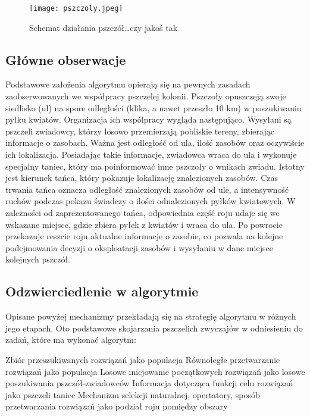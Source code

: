 \documentclass[a4paper,12pt,notitlepage]{mwrep}
\begin{document}
\begin{figure}[H] %
\centering
\texttt{[image: pszczoly.jpeg]}
\caption{Schemat działania pszczół\ldots czy jakoś tak}
\label{fig:Pszczoly}
\end{figure}

\subsection{Główne obserwacje}
Podstawowe założenia algorytmu opierają się na pewnych zasadach zaobserwowanych we współpracy pszczelej kolonii.
Pszczoły opuszczeją swoje siedlisko (ul) na spore odległości (klika, a nawet przeszło 10 km) w poszukiwaniu pyłku kwiatów.
Organizacja ich wspólpracy wygląda następująco. Wysyłani są pszczeli zwiadowcy, którzy losowo przemierzają pobliskie tereny,
zbierając informacje o zasobach. Ważna jest odległość od ula, ilość zasobów oraz oczywiście ich lokalizacja. Posiadając takie
informacje, zwiadowca wraca do ula i wykonuje specjalny taniec, który ma poinformować inne pszczoły o wnikach zwiadu. Istotny
jest kierunek tańca, który pokazuje lokalizację znalezionych zasobów. Czas trwania tańca oznacza odległość znalezionych zasobów
od ule, a intensywność ruchów podczas pokazu świadczy o ilości odnalezionych pyłków kwiatowych. W zależności od zaprezentowanego
tańca, odpowiednia część roju udaje się we wskazane miejsce, gdzie zbiera pyłek z kwiatów i wraca do ula. Po powrocie przekazuje
reszcie roju aktualne informacje o zasobie, co pozwala na kolejne podejmowania decyzji o oksploatacji zasobów i wysyłaniu w dane
miejsce kolejnych pszczół.

\subsection{Odzwierciedlenie w algorytmie}
Opisane powyżej mechanizmy przekładają się na strategię algorytmu w różnych jego etapach. Oto podstawowe skojarzania pszczelich zwyczajów w odniesieniu do zadań, które ma wykonać algorytm:
\begin{itemize}
	\fe	Zbiór przeszukiwanych rozwiązań jako populacja
	\fe	Równoległe przetwarzanie rozwiązań jako populacja
	\fe	Losowe inicjowanie początkowych rozwiązań jako losowe poszukiwania pszczół-zwiadowców
	\fe	Informacja dotycząca funkcji celu rozwiązań jako pszczeli taniec
	\fe	Mechanizm selekcji naturalnej, opertatory, sposób przetwarzania rozwiązań jako podział roju pomiędzy obszary
\end{itemize}
\end{document}
